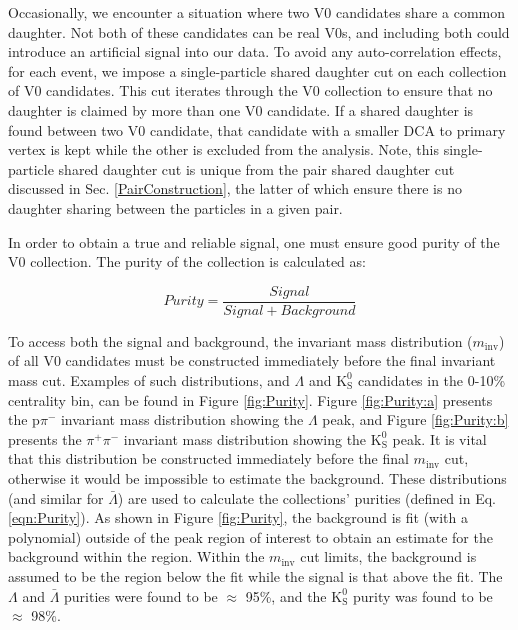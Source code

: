 \documentclass[ALICE,manyauthors]{cernphprep}
\newcommand{\minv}{$m_{\mathrm{inv}}$\xspace}
\newcommand{\Lam}{$\Lambda$\xspace}
\newcommand{\ALam}{$\bar{\Lambda}$\xspace}
\newcommand{\Ks}{$\mathrm{K^{0}_{S}}$\xspace}
\begin{document}
Occasionally, we encounter a situation where two V0 candidates share a common daughter.
Not both of these candidates can be real V0s, and including both could introduce an artificial signal into our data.
To avoid any auto-correlation effects, for each event, we impose a single-particle shared daughter cut on each collection of V0 candidates.
This cut iterates through the V0 collection to ensure that no daughter is claimed by more than one V0 candidate.
If a shared daughter is found between two V0 candidate, that candidate with a smaller DCA to primary vertex is kept while the other is excluded from the analysis.
Note, this single-particle shared daughter cut is unique from the pair shared daughter cut discussed in Sec. \ref{PairConstruction}, the latter of which ensure there is no daughter sharing between the particles in a given pair.

In order to obtain a true and reliable signal, one must ensure good purity of the V0 collection.  The purity of the collection is calculated as:

\begin{equation}
 Purity = \frac{Signal}{Signal + Background}
\label{eqn:Purity}
\end{equation}

To access both the signal and background, the invariant mass distribution (\minv) of all V0 candidates must be constructed immediately before the final invariant mass cut.
Examples of such distributions, and \Lam and \Ks candidates in the 0-10\% centrality bin, can be found in Figure \ref{fig:Purity}.
Figure \ref{fig:Purity:a} presents the p$\pi^{-}$ invariant mass distribution showing the \Lam peak, and Figure \ref{fig:Purity:b} presents the $\pi^{+}\pi^{-}$ invariant mass distribution showing the \Ks peak.
It is vital that this distribution be constructed immediately before the final \minv cut, otherwise it would be impossible to estimate the background.
These distributions (and similar for \ALam) are used to calculate the collections' purities (defined in Eq. \ref{eqn:Purity}).
As shown in Figure \ref{fig:Purity}, the background is fit (with a polynomial) outside of the peak region of interest to obtain an estimate for the background within the region.
Within the \minv cut limits, the background is assumed to be the region below the fit while the signal is that above the fit.
The \Lam and \ALam purities were found to be $\approx$ 95\%, and the \Ks purity was found to be $\approx$ 98\%.
\end{document}

